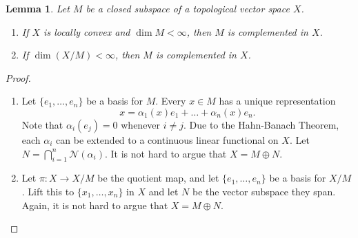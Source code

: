 \documentclass[12pt]{article}
\theoremstyle{thmstyle}
\newtheorem{lemma}[theorem]{Lemma}
\theoremstyle{defstyle}
\newcommand{\scrN}{\mathscr N}
\begin{document}
\begin{lemma}
    Let $M$ be a closed subspace of a topological vector space $X$. 
    \begin{enumerate}[label=(\alph*)]
        \item If $X$ is locally convex and $\dim M < \infty$, then $M$ is complemented in $X$. 
        \item If $\dim(X/M) < \infty$, then $M$ is complemented in $X$.
    \end{enumerate}
\end{lemma}
\begin{proof}
\begin{enumerate}[label=(\alph*)]
    \item Let $\{e_1,\dots,e_n\}$ be a basis for $M$. Every $x\in M$ has a unique representation 
    \begin{equation*}
        x = \alpha_1(x)e_1 + \dots + \alpha_n(x)e_n.
    \end{equation*}
    Note that $\alpha_i(e_j) = 0$ whenever $i\ne j$. Due to the Hahn-Banach Theorem, each $\alpha_i$ can be extended to a continuous linear functional on $X$. Let $\displaystyle N = \bigcap_{i = 1}^n\scrN(\alpha_i)$. It is not hard to argue that $X = M\oplus N$.

    \item Let $\pi: X\to X/M$ be the quotient map, and let $\{e_1,\dots,e_n\}$ be a basis for $X/M$. Lift this to $\{x_1,\dots,x_n\}$ in $X$ and let $N$ be the vector subspace they span. Again, it is not hard to argue that $X = M\oplus N$.\qedhere
\end{enumerate}
\end{proof}
\end{document}
